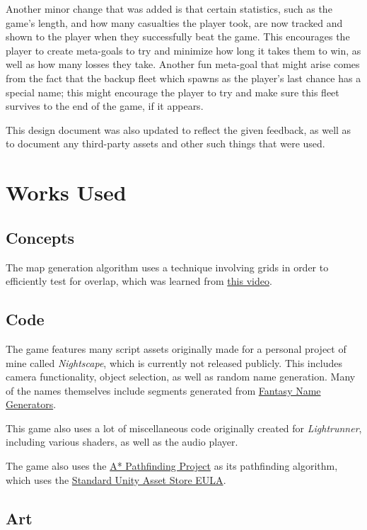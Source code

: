 \documentclass[10pt]{article}
\begin{document}
Another minor change that was added is that certain statistics, such as the game's length, and how many casualties the player took,
are now tracked and shown to the player when they successfully beat the game. This encourages the player to create meta-goals to try
and minimize how long it takes them to win, as well as how many losses they take. Another fun meta-goal that might arise comes from the
fact that the backup fleet which spawns as the player's last chance has a special name; this might encourage the player to try and make sure
this fleet survives to the end of the game, if it appears.

This design document was also updated to reflect the given feedback, as well as to document any third-party assets and other such things that were used.

\section{Works Used}

\subsection{Concepts}

The map generation algorithm uses a technique involving grids in order to efficiently test for overlap, which was learned from
\href{https://www.youtube.com/watch?v=7WcmyxyFO7o}{this video}.

\subsection{Code}

The game features many script assets originally made for a personal project of mine called \textit{Nightscape},
which is currently not released publicly. This includes camera functionality, object selection, as well as
random name generation. Many of the names themselves include segments generated from
\href{https://www.fantasynamegenerators.com/}{Fantasy Name Generators}.

This game also uses a lot of miscellaneous code originally created for \textit{Lightrunner}, including various shaders,
as well as the audio player.

The game also uses the \href{https://arongranberg.com/astar/}{A* Pathfinding Project} as its pathfinding algorithm,
which uses the \href{https://unity3d.com/legal/as_terms}{Standard Unity Asset Store EULA}.

\subsection{Art}
\end{document}
